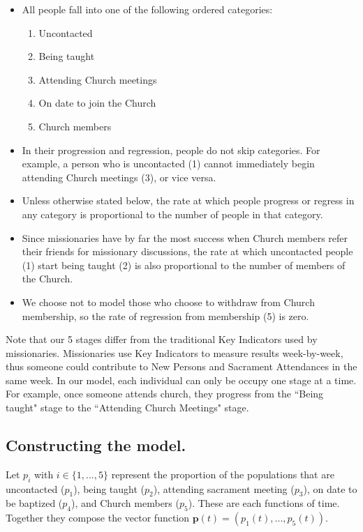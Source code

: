 \documentclass[11pt]{amsart}
\begin{document}
\begin{itemize}
    \item All people fall into one of the following ordered categories:
    \begin{enumerate}
        \item Uncontacted
        \item Being taught
        \item Attending Church meetings
        \item On date to join the Church
        \item Church members
    \end{enumerate}
    \item In their progression and regression, people do not skip categories. For example, a person who is uncontacted (1) cannot immediately begin attending Church meetings (3), or vice versa.
    \item Unless otherwise stated below, the rate at which people progress or regress in any category is proportional to the number of people in that category.
    \item Since missionaries have by far the most success when Church members refer their friends for missionary discussions, the rate at which uncontacted people (1) start being taught (2) is also proportional to the number of members of the Church.
    \item We choose not to model those who choose to withdraw from Church membership, so the rate of regression from membership (5) is zero.
\end{itemize}

Note that our 5 stages differ from the traditional Key Indicators used by missionaries. Missionaries use Key Indicators to measure results week-by-week, thus someone could contribute to New Persons and Sacrament Attendances in the same week. In our model, each individual can only be occupy one stage at a time. For example, once someone attends church, they progress from the ``Being taught" stage to the ``Attending Church Meetings" stage.

\begin{samepage}
\subsection*{Constructing the model.}
\begin{center}
\hspace{0pt}
\end{center}

Let $p_i$ with $i \in \{1, ..., 5\}$ represent the proportion of the populations that are uncontacted ($p_1$), being taught ($p_2$), attending sacrament meeting ($p_3$), on date to be baptized ($p_4$), and Church members ($p_5$). These are each functions of time. Together they compose the vector function $\boldsymbol{p}(t) = \left(p_1(t), ..., p_5(t)\right)$.
\end{samepage}
\end{document}
